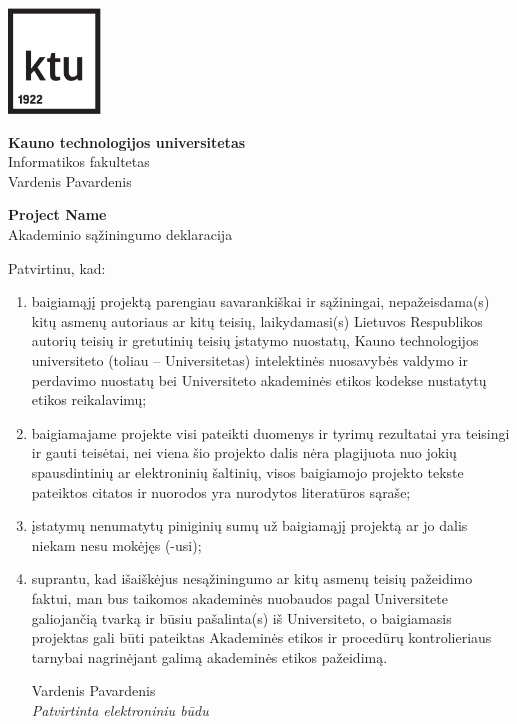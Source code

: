\thispagestyle{noNumber}
\begin{center}
\includegraphics[width=2.46cm]{ktu.pdf}
\vspace{0.3cm}

\normalsize{\textbf{Kauno technologijos universitetas}} \\
Informatikos fakultetas \\
Vardenis Pavardenis

\vspace{3cm}

\Large \textbf{Project Name} \\
\large
Akademinio sąžiningumo deklaracija

\vspace{1cm}
\end{center}

Patvirtinu, kad:
\begin{enumerate}
\item{
        baigiamąjį projektą parengiau savarankiškai ir sąžiningai,
        nepažeisdama(s) kitų asmenų autoriaus ar kitų teisių, laikydamasi(s)
        Lietuvos Respublikos autorių teisių ir gretutinių teisių įstatymo
        nuostatų, Kauno technologijos universiteto (toliau – Universitetas)
        intelektinės nuosavybės valdymo ir perdavimo nuostatų bei Universiteto
        akademinės etikos kodekse nustatytų etikos reikalavimų;
}
\item{
      baigiamajame projekte visi pateikti duomenys ir tyrimų rezultatai yra
      teisingi ir gauti teisėtai, nei viena šio projekto dalis nėra plagijuota
      nuo jokių spausdintinių ar elektroninių šaltinių, visos baigiamojo
      projekto tekste pateiktos citatos ir nuorodos yra nurodytos literatūros
      sąraše;
}
\item{
      įstatymų nenumatytų piniginių sumų už baigiamąjį projektą ar jo dalis niekam nesu mokėjęs (-usi);
}
\item{
      suprantu, kad išaiškėjus nesąžiningumo ar kitų asmenų teisių pažeidimo
      faktui, man bus taikomos akademinės nuobaudos pagal Universitete
      galiojančią tvarką ir būsiu pašalinta(s) iš Universiteto, o baigiamasis
      projektas gali būti pateiktas Akademinės etikos ir procedūrų
      kontrolieriaus tarnybai nagrinėjant galimą akademinės etikos pažeidimą.
}

\vspace{2cm}
\begin{flushright}
\begin{minipage}{5cm}
Vardenis Pavardenis \\
\textit{Patvirtinta elektroniniu būdu}
\end{minipage}
\end{flushright}

\end{enumerate}
